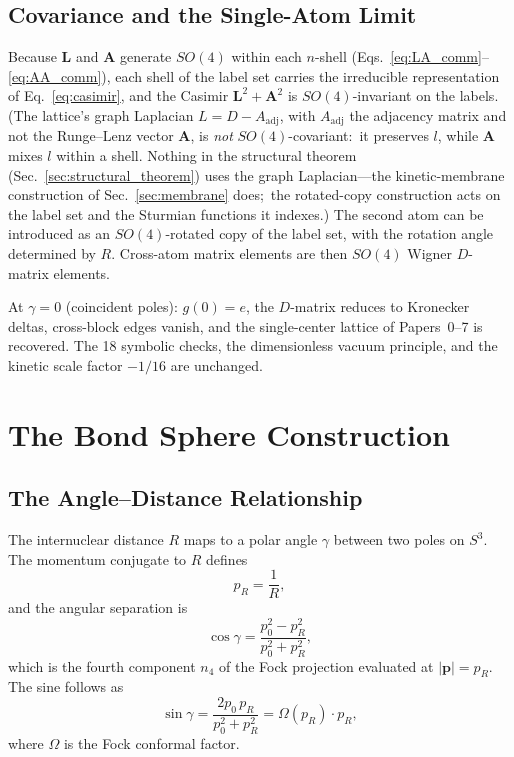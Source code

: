 \documentclass[aps,pra,twocolumn,superscriptaddress,longbibliography]{revtex4-2}
\theoremstyle{remark}
\theoremstyle{plain}
\begin{document}
\subsection{Covariance and the Single-Atom Limit}

Because $\mathbf{L}$ and $\mathbf{A}$ generate $SO(4)$ within each
$n$-shell (Eqs.~\eqref{eq:LA_comm}--\eqref{eq:AA_comm}), each shell of
the label set carries the irreducible representation of
Eq.~\eqref{eq:casimir}, and the Casimir $\mathbf{L}^2+\mathbf{A}^2$ is
$SO(4)$-invariant on the labels.  (The lattice's graph Laplacian
$L = D - A_{\mathrm{adj}}$, with $A_{\mathrm{adj}}$ the adjacency matrix
and not the Runge--Lenz vector $\mathbf{A}$, is \emph{not}
$SO(4)$-covariant:\ it preserves $l$, while $\mathbf{A}$ mixes $l$ within
a shell.  Nothing in the structural theorem
(Sec.~\ref{sec:structural_theorem}) uses the graph Laplacian---the
kinetic-membrane construction of Sec.~\ref{sec:membrane} does;\ the
rotated-copy construction acts on the label set and the Sturmian
functions it indexes.)  The second
atom can be introduced as an $SO(4)$-rotated copy of the label set, with
the rotation angle determined by $R$.  Cross-atom matrix elements are then $SO(4)$
Wigner $D$-matrix elements.

At $\gamma = 0$ (coincident poles): $g(0) = e$, the $D$-matrix reduces
to Kronecker deltas, cross-block edges vanish, and the single-center
lattice of Papers~0--7 is recovered.  The 18 symbolic checks, the
dimensionless vacuum principle, and the kinetic scale factor $-1/16$
are unchanged.


\section{The Bond Sphere Construction}
\label{sec:bond_sphere}

\subsection{The Angle--Distance Relationship}

The internuclear distance $R$ maps to a polar angle $\gamma$ between
two poles on $S^3$.  The momentum conjugate to $R$ defines
\begin{equation}
p_R = \frac{1}{R},
\label{eq:pR}
\end{equation}
and the angular separation is
\begin{equation}
\cos\gamma = \frac{p_0^2 - p_R^2}{p_0^2 + p_R^2},
\label{eq:cos_gamma}
\end{equation}
which is the fourth component $n_4$ of the Fock projection evaluated
at $|\mathbf{p}| = p_R$.  The sine follows as
\begin{equation}
\sin\gamma = \frac{2p_0\, p_R}{p_0^2 + p_R^2} = \Omega(p_R)\cdot p_R,
\label{eq:sin_gamma}
\end{equation}
where $\Omega$ is the Fock conformal factor.
\end{document}
